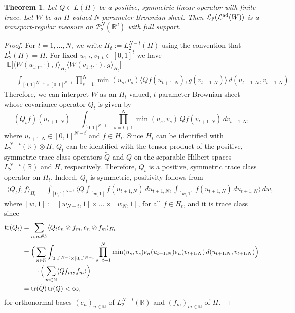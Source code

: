 \documentclass[a4paper]{amsart}
\newtheorem{theorem}{Theorem}
\numberwithin{theorem}{section}
\theoremstyle{definition}
\newcommand{\N}{\mathbb{N}}
\newcommand{\R}{\mathbb{R}}
\newcommand{\law}{\mathcal{L}}
\newcommand{\Pc}{\mathcal P}
\newcommand{\lawad}{\law^{\textup{ad}}}
\begin{document}
\begin{theorem} \label{thm:sheet.adapted.TR}
    Let $Q \in L(H)$ be a positive, symmetric linear operator with finite trace.
    Let $W$ be an $H$-valued $N$-parameter Brownian sheet. 
    Then $\law_\mathbb P(\lawad(W))$ is a transport-regular measure on $\Pc_2^{N}(\mathbb R^d)$ with full support.
\end{theorem}

\begin{proof}
    For $t = 1,\dots, N$, we write $H_t := L_2^{N-t}(H)$ using the convention that $L_2^0(H) = H$.
    For fixed $u_{1:t}, v_{1:t} \in [0,1]^t$ we have
        \begin{multline*}
        \mathbb E\big[ \langle W(u_{1:t},\cdot),f \rangle_{H_t} \langle W(v_{1:t},\cdot), g \rangle_{H_t} \big]
        \\
        =
        \int_{[0,1]^{N-t}\times[0,1]^{N-t}} \prod_{s = 1}^N \min(u_s,v_s) \langle Qf(u_{t+1:N}), g(v_{t+1:N}) \rangle \, d(u_{t+1:N},v_{t+1:N}).
    \end{multline*}
    Therefore, we can interpret $W$ as an $H_t$-valued, $t$-parameter Brownian sheet whose covariance operator $Q_t$ is given by
    \[
        (Q_t f)(u_{t+1:N}) = \int_{[0,1]^{N-t}} \prod_{s = t + 1}^N \min(u_s,v_s) \, Qf(v_{t+1:N}) \, dv_{t+1:N},
    \]
    where $u_{t+1:N} \in [0,1]^{N-t}$ and $f \in H_t$.
    Since $H_t$ can be identified with $L_2^{N-t}(\R) \otimes H$, $Q_t$ can be identified with the tensor product of the positive, symmetric trace class operators $\tilde Q$ and $Q$ on the separable Hilbert spaces $L_2^{N-t}(\R)$ and $H$, respectively.
    Therefore, $Q_t$ is a positive, symmetric trace class operator on $H_t$. 
    Indeed, $Q_t$ is symmetric, positivity follows from
    \begin{align*}
        \langle Q_t f, f \rangle_{H_t} =
        \int_{[0,1]^{N-t}} \Big\langle Q \int_{[w,1]} f(u_{t+1,N}) \, du_{t+1,N}, \int_{[w,1]} f(u_{t+1,N}) \, du_{t+1,N} \Big\rangle\, dw,
    \end{align*}
    where $[w,1] := [w_{N-t},1] \times \dots \times [w_N,1]$, for all $f \in H_t$, and it is trace class since
    \begin{align*}
        {\rm tr}(Q_t) &= \sum_{n,m  \in \mathbb N} \langle Q_t e_n \otimes f_m, e_n \otimes f_m\rangle_{H_t} \\
        &= \Big( \sum_{n \in \N} \int_{[0,1]^{N-t} \times [0,1]^{N-t}} \prod_{s = t+1}^N \min(u_s,v_s) e_n(u_{t+1:N})e_n(v_{t+1:N}) \, d(u_{t+1:N},v_{t+1:N}) \Big)
        \\ &\qquad \cdot \Big( \sum_{m \in \mathbb N} \langle Qf_m, f_m \rangle \Big)
        \\
        &= {\rm tr}(\tilde Q) \, {\rm tr}(Q) < \infty,
    \end{align*}
    for orthonormal bases $(e_n)_{n \in \mathbb N}$ of $L_2^{N-t}(\R)$ and $(f_m)_{m \in \mathbb N}$ of $H$.


\end{proof}
\end{document}
